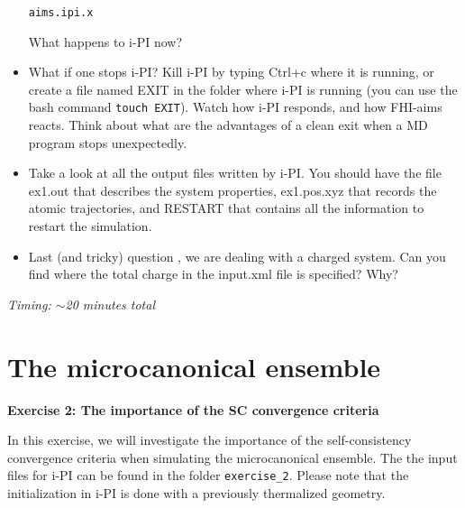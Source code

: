 \documentclass[a4paper,11pt]{scrartcl}
\def\FHI{aims.ipi.x}
\begin{document}
\begin{itemize}
 \begin{center}
   \texttt{\FHI}
\end{center}


What happens to i-PI now?

\item What if one stops i-PI? Kill i-PI by typing Ctrl+c where it is running, or
create a file named EXIT in the folder where i-PI is running (you can use the
bash command  \texttt{touch EXIT}). Watch how i-PI responds, and how FHI-aims
reacts. Think about what are the advantages of a clean exit when a MD
program stops unexpectedly.

\item Take a look at all the output files written by i-PI. You should have the file ex1.out that describes the system properties, ex1.pos.xyz that records
the atomic trajectories, and RESTART that contains all the information to
restart the simulation.

\item Last (and tricky) question , we are dealing with a charged system. Can you find where the total charge in the input.xml file is specified? 
Why?
\end{itemize}
 
\textit{Timing:  $\sim$20 minutes total}

\newpage
\section*{The microcanonical ensemble}

{\large\textbf{Exercise 2: The importance of the SC convergence criteria}}

In this exercise, we will investigate the importance of the self-consistency convergence criteria
when simulating the microcanonical ensemble. The the input files for i-PI can be found in the folder \texttt{exercise\_2}. 
Please note that the initialization in i-PI is done with a previously thermalized geometry.

\end{document}
